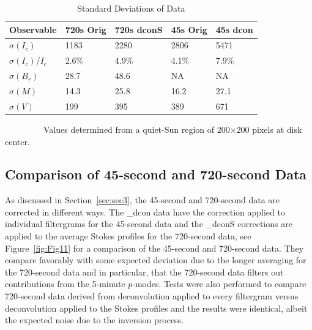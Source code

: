 \documentclass[trackchanges]{aastex62}
\begin{document}
\begin{table}[hb]
\centering
\begin{threeparttable}
\caption{Standard Deviations of Data}
\begin{tabular}{lllll}
\hline 
\multicolumn{1}{l}{\textbf{Observable}} &
\multicolumn{1}{l}{\textbf{720s Orig}} &
\multicolumn{1}{l}{\textbf{720s dconS}} & 
\multicolumn{1}{l}{\textbf{45s Orig}} & 
\multicolumn{1}{l}{\textbf{45s dcon}}  \\
\hline
$\sigma(I_c)$ & 1183 & 2280 & 2806 & 5471  \\
$\sigma(I_c)$/$I_c$ & 2.6\% & 4.9\% & 4.1\% & 7.9\%  \\
$\sigma(B_r)$ &28.7 & 48.6 & NA & NA \\
$\sigma(M)$ & 14.3 & 25.8 & 16.2 & 27.1 \\
$\sigma(V)$ & 199 & 395 &389 & 671\\
\hline 
\end{tabular}
\begin{tablenotes}
\footnotesize
\centering
\item ~~~~~~~~~Values determined from a quiet-Sun region of 200$\times$200 pixels at disk center. 
\end{tablenotes}
\end{threeparttable}
\label{tab:table2}
\end{table}

\subsection{Comparison of 45-second and 720-second Data}\label{sec:sec4.4}

As discussed in Section~\ref{sec:sec3}, the 45-second and 720-second data are corrected in different ways. The \_dcon data have the correction applied to individual filtergrams for the 45-second data and the \_dconS corrections are applied to the average Stokes profiles for the 720-second data, see Figure~\ref{fig:Fig11} for a comparison of the 45-second and 720-second data. They compare favorably with some expected deviation due to the longer averaging for the 720-second data and in particular, that the 720-second data filters out contributions from the 5-minute $p$-modes. Tests were also performed to compare 720-second data derived from deconvolution applied to every filtergram versus deconvolution applied to the Stokes profiles and the results were identical, albeit the expected noise due to the inversion process. 
\end{document}

